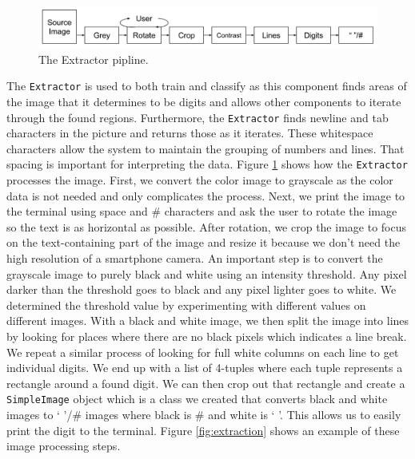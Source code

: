 \documentclass[a4paper,12pt]{article}
\begin{document}
\begin{figure}[h]
    \centering
    \includegraphics[width=\textwidth]{extractor2}
    \caption{The Extractor pipline.}
    \label{fig:extractor}
\end{figure}

The \texttt{Extractor} is used to both train and classify as this component finds areas of the image that it determines to be digits and allows other components to iterate through the found regions. Furthermore, the \texttt{Extractor} finds newline and tab characters in the picture and returns those as it iterates. These whitespace characters allow the system to maintain the grouping of numbers and lines. That spacing is important for interpreting the data. Figure \ref{fig:extractor} shows how the \texttt{Extractor} processes the image. First, we convert the color image to grayscale as the color data is not needed and only complicates the process. Next, we print the image to the terminal using space and \# characters and ask the user to rotate the image so the text is as horizontal as possible. After rotation, we crop the image to focus on the text-containing part of the image and resize it because we don't need the high resolution of a smartphone camera. An important step is to convert the grayscale image to purely black and white using an intensity threshold. Any pixel darker than the threshold goes to black and any pixel lighter goes to white. We determined the threshold value by experimenting with different values on different images. With a black and white image, we then split the image into lines by looking for places where there are no black pixels which indicates a line break. We repeat a similar process of looking for full white columns on each line to get individual digits. We end up with a list of 4-tuples where each tuple represents a rectangle around a found digit. We can then crop out that rectangle and create a \texttt{SimpleImage} object which is a class we created that converts black and white images to \lq \hspace{.7em} '/\# images where black is \# and white is \lq \hspace{.7em} '. This allows us to easily print the digit to the terminal. Figure \ref{fig:extraction} shows an example of these image processing steps. \\
\end{document}
